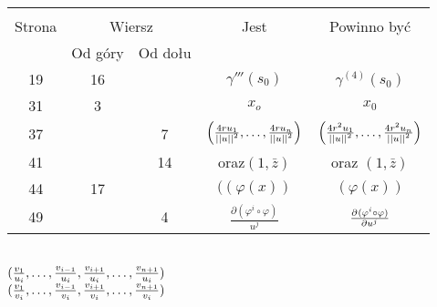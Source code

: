 \documentclass[a4paper,11pt]{article}
\begin{document}
\begin{center}
  \begin{tabular}{|c|c|c|c|c|}
    \hline
    & \multicolumn{2}{c|}{} & & \\
    Strona & \multicolumn{2}{c|}{Wiersz} & Jest
                              & Powinno być \\ \cline{2-3}
    & Od góry & Od dołu & & \\
    \hline
    19 & 16 & & $\gamma'''( s_{ 0 } )$ & $\gamma^{ (4) }( s_{ 0 } )$ \\
    31 &  3 & & $x_{ o }$ & $x_{ 0 }$ \\
    37 & & 7 & $\left( \frac{ 4 r u_{ 1 } }{ \left|\left|  u  \right|\right|^{ 2 } }, \ldots,
               \frac{ 4 r u_{ n } }{ \left|\left|  u  \right|\right|^{ 2 } } \right)$
           & $\left( \frac{ 4 r^{ 2 } u_{ 1 } }{ \left|\left|  u  \right|\right|^{ 2 } },
             \ldots, \frac{ 4 r^{ 2 } u_{ n } }{ \left|\left|  u  \right|\right|^{ 2 } }
             \right)$ \\
    41 & & 14 & oraz$( 1, \bar{ z } )$ & oraz $( 1, \bar{ z } )$ \\
    44 & 17 & & $( ( \varphi( x ) )$ & $( \varphi( x ) )$ \\
    49 & &  4 & $\frac{ \partial ( \varphi^{ i } \circ \varphi ) }
                { u^{ j } }$
           & $\frac{ \partial^{  } {  ( \varphi^{ i } \circ \varphi )  } }{ \partial {  u^{ j }  }^{  } }$ \\
    \hline
  \end{tabular}
\end{center}
\noi
{} \\
\Jest
$( \frac{ v_{ 1 } }{ u_{ i } }, \ldots, \frac{ v_{ i - 1 } }{ u_{ i } },
\frac{ v_{ i + 1 } }{ u_{ i } }, \ldots, \frac{ v_{ n + 1 } }{ u_{ i } } )$ \\
\Pow $( \frac{ v_{ 1 } }{ v_{ i } }, \ldots, \frac{ v_{ i - 1 } }{ v_{ i } },
\frac{ v_{ i + 1 } }{ v_{ i } }, \ldots, \frac{ v_{ n + 1 } }{ v_{ i } } )$ \\

\vspace{\spaceTwo}







\end{document}
